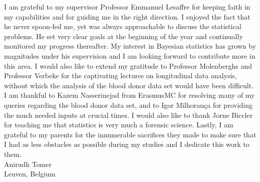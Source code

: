 I am grateful to my supervisor Professor Emmanuel Lesaffre for keeping faith in my capabilities and for guiding me in the right direction. I enjoyed the fact that he never spoon-fed me, yet was always approachable to discuss the statistical problems. He set very clear goals at the beginning of the year and continually monitored my progress thereafter. My interest in Bayesian statistics has grown by magnitudes under his supervision and I am looking forward to contribute more in this area. I would also like to extend my gratitude to Professor Molenberghs and Professor Verbeke for the captivating lectures on longitudinal data analysis, without which the analysis of the blood donor data set would have been difficult. I am thankful to Kazem Nasserinejad from ErasmusMC for resolving many of my queries regarding the blood donor data set, and to Igor Milhorança for providing the much needed inputs at crucial times. I would also like to thank Jorne Biccler for teaching me that statistics is very much a forensic science. Lastly, I am grateful to my parents for the innumerable sacrifices they made to make sure that I had as less obstacles as possible during my studies and I dedicate this work to them.\\

Anirudh Tomer\\
Leuven, Belgium